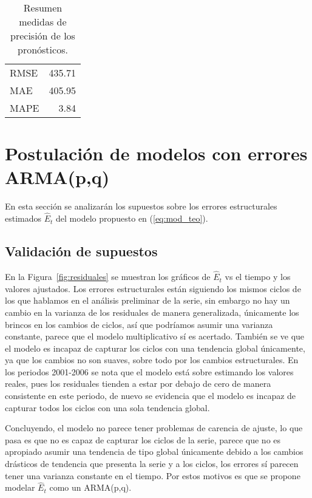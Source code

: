 \documentclass[11pt, letterpaper, twoside]{article}
\begin{document}
\begin{table}[ht!]
\caption{Resumen medidas de precisión de los pronósticos.}
\label{tab:prec_pron}
\centering
\begin{tabular}{lr}
\hline
RMSE & 435.71 \\
MAE & 405.95 \\
MAPE & 3.84 \\
\hline
\end{tabular}
\end{table}

\section{Postulación de modelos con errores ARMA(p,q)}

En esta sección se analizarán los supuestos sobre los errores estructurales estimados $\hat{E}_t$ del modelo propuesto en (\ref{eq:mod_teo}).

\subsection{Validación de supuestos}

En la Figura~\ref{fig:residuales} se muestran los gráficos de $\hat{E}_t$ vs el tiempo y los valores ajustados. Los errores estructurales están siguiendo los mismos ciclos de los que hablamos en el análisis preliminar de la serie, sin embargo no hay un cambio en la varianza de los residuales de manera generalizada, únicamente los brincos en los cambios de ciclos, así que podríamos asumir una varianza constante, parece que el modelo multiplicativo sí es acertado. También se ve que el modelo es incapaz de capturar los ciclos con una tendencia global únicamente, ya que los cambios no son suaves, sobre todo por los cambios estructurales. En los periodos 2001-2006 se nota que el modelo está sobre estimando los valores reales, pues los residuales tienden a estar por debajo de cero de manera consistente en este periodo, de nuevo se evidencia que el modelo es incapaz de capturar todos los ciclos con una sola tendencia global.

Concluyendo, el modelo no parece tener problemas de carencia de ajuste, lo que pasa es que no es capaz de capturar los ciclos de la serie, parece que no es apropiado asumir una tendencia de tipo global únicamente debido a los cambios drásticos de tendencia que presenta la serie y a los ciclos, los errores sí parecen tener una varianza constante en el tiempo. Por estos motivos es que se propone modelar $\hat{E}_t$ como un ARMA(p,q).
\end{document}
